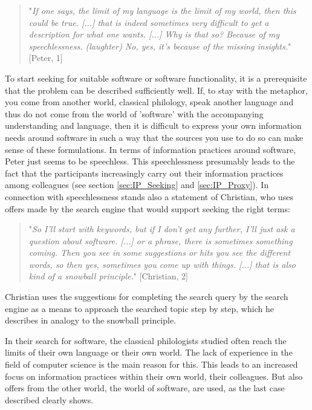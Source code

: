 \documentclass[12pt, a4paper, titlepage, oneside, abstract=true, toc=listof, toc=bibliography]{scrreprt}
\begin{document}
{\begin{quotation}
"\textit{If one says, the limit of my language is the limit of my world, then this could be true. [...] that is indeed sometimes very difficult to get a description for what one wants. [...] Why is that so? Because of my speechlessness. (laughter) No, yes, it's because of the missing insights.}" [Peter, 1]
\end{quotation}

To start seeking for suitable software or software functionality, it is a prerequisite that the problem can be described sufficiently well. If, to stay with the metaphor, you come from another world, classical philology, speak another language and thus do not come from the world of 'software' with the accompanying understanding and language, then it is difficult to express your own information needs around software in such a way that the sources you use to do so can make sense of these formulations. In terms of information practices around software, Peter just seems to be speechless. This speechlessness presumably leads to the fact that the participants increasingly carry out their information practices among colleagues (see section \ref{sec:IP_Seeking} and \ref{sec:IP_Proxy}). In connection with speechlessness stands also a statement of Christian, who uses offers made by the search engine that would support seeking the right terms: 

\begin{quotation}
"\textit{So I'll start with keywords, but if I don't get any further, I'll just ask a question about software. [...] or a phrase, there is sometimes something coming. Then you see in some suggestions or hits you see the different words, so then yes, sometimes you come up with things. [...] that is also kind of a snowball principle.}" [Christian, 2]
\end{quotation}

Christian uses the suggestions for completing the search query by the search engine as a means to approach the searched topic step by step, which he describes in analogy to the snowball principle.

In their search for software, the classical philologists studied often reach the limits of their own language or their own world. The lack of experience in the field of computer science is the main reason for this. This leads to an increased focus on information practices within their own world, their colleagues. But also offers from the other world, the world of software, are used, as the last case described clearly shows.

}
\end{document}

